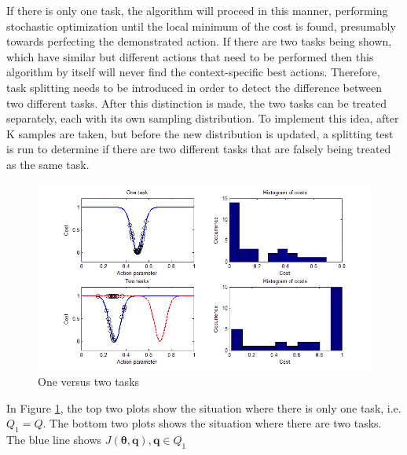 \documentclass[12pt]{article}
\newcommand{\mymath}[1]{\ensuremath{#1}\xspace}
\newcommand{\app}    {\mymath{\bm{\theta}}}
\newcommand{\taskp}  {\mymath{\mathbf{q}}}
\newcommand{\taskpsp}{\mymath{Q}}
\newcommand{\costf}  {\mymath{J}}
\begin{document}
If there is only one task, the algorithm will proceed in this manner, performing stochastic optimization until the local minimum of the cost is found, presumably towards perfecting the demonstrated action. If there are two tasks being shown, which have similar but different actions that need to be performed then this algorithm by itself will never find the context-specific best actions. Therefore, task splitting needs to be introduced in order to detect the difference between two different tasks. After this distinction is made, the two tasks can be treated separately, each with its own sampling distribution. To implement this idea, after K samples are taken, but before the new distribution is updated, a splitting test is run to determine if there are two different tasks that are falsely being treated as the same task.

\begin{figure}[ht]
  \centering
  \includegraphics[width=0.9\columnwidth]{one_vs_two_tasks.png}
  \caption{One versus two tasks}
  \label{fig:1vs2tasks}
\end{figure} 

In Figure \ref{fig:1vs2tasks}, the top two plots show the situation where there is only one task, i.e. $\taskpsp_1 = \taskpsp$. The bottom two plots shows the situation where there are two tasks. The blue line shows $\costf(\app,\taskp), \taskp \in \taskpsp_1$
\end{document}
